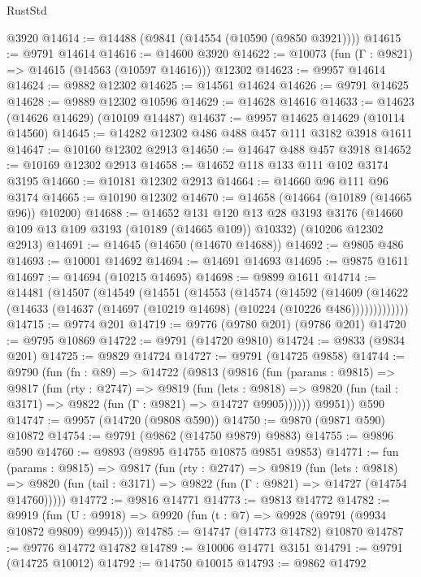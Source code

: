 \begin{lexlean}{RustStd}
\begin{coremodule}
    @3920
@14614 := @14488 (@9841 (@14554 (@10590 (@9850 @3921))))
@14615 := @9791 @14614
@14616 := @14600 @3920
@14622 := @10073 (fun (Γ : @9821) => @14615 (@14563 (@10597 @14616))) @12302
@14623 := @9957 @14614
@14624 := @9882 @12302
@14625 := @14561 @14624
@14626 := @9791 @14625
@14628 := @9889 @12302 @10596
@14629 := @14628 @14616
@14633 := @14623 (@14626 @14629) (@10109 @14487)
@14637 := @9957 @14625 @14629 (@10114 @14560)
@14645 := @14282 @12302 @486 @488 @457 @111 @3182 @3918 @1611
@14647 := @10160 @12302 @2913
@14650 := @14647 @488 @457 @3918
@14652 := @10169 @12302 @2913
@14658 := @14652 @118 @133 @111 @102 @3174 @3195
@14660 := @10181 @12302 @2913
@14664 := @14660 @96 @111 @96 @3174
@14665 := @10190 @12302
@14670 := @14658 (@14664 (@10189 (@14665 @96)) @10200)
@14688 := @14652
    @131
    @120
    @13
    @28
    @3193
    @3176
    (@14660 @109 @13 @109 @3193 (@10189 (@14665 @109)) @10332)
    (@10206 @12302 @2913)
@14691 := @14645 (@14650 (@14670 @14688))
@14692 := @9805 @486
@14693 := @10001 @14692
@14694 := @14691 @14693
@14695 := @9875 @1611
@14697 := @14694 (@10215 @14695)
@14698 := @9899 @1611
@14714 := @14481
    (@14507
      (@14549
        (@14551
          (@14553
            (@14574
              (@14592
                (@14609
                  (@14622 (@14633 (@14637 (@14697 (@10219 @14698) (@10224 (@10226 @486)))))))))))))
@14715 := @9774 @201
@14719 := @9776 (@9780 @201) (@9786 @201)
@14720 := @9795 @10869
@14722 := @9791 (@14720 @9810)
@14724 := @9833 (@9834 @201)
@14725 := @9829 @14724
@14727 := @9791 (@14725 @9858)
@14744 := @9790
    (fun (fn : @89) =>
    @14722
      (@9813
        (@9816
          (fun (params : @9815) =>
          @9817
            (fun (rty : @2747) =>
            @9819
              (fun (lets : @9818) =>
              @9820 (fun (tail : @3171) => @9822 (fun (Γ : @9821) => @14727 @9905))))))
        @9951))
    @590
@14747 := @9957 (@14720 (@9808 @590))
@14750 := @9870 (@9871 @590) @10872
@14754 := @9791 (@9862 (@14750 @9879) @9883)
@14755 := @9896 @590
@14760 := @9893 (@9895 @14755 @10875 @9851 @9853)
@14771 := fun (params : @9815) =>
  @9817
    (fun (rty : @2747) =>
    @9819
      (fun (lets : @9818) =>
      @9820 (fun (tail : @3171) => @9822 (fun (Γ : @9821) => @14727 (@14754 @14760)))))
@14772 := @9816 @14771
@14773 := @9813 @14772
@14782 := @9919
    (fun (U : @9918) => @9920 (fun (t : @7) => @9928 (@9791 (@9934 @10872 @9809) @9945)))
@14785 := @14747 (@14773 @14782) @10870
@14787 := @9776 @14772 @14782
@14789 := @10006 @14771 @3151
@14791 := @9791 (@14725 @10012)
@14792 := @14750 @10015
@14793 := @9862 @14792

\end{coremodule}
\end{lexlean}
